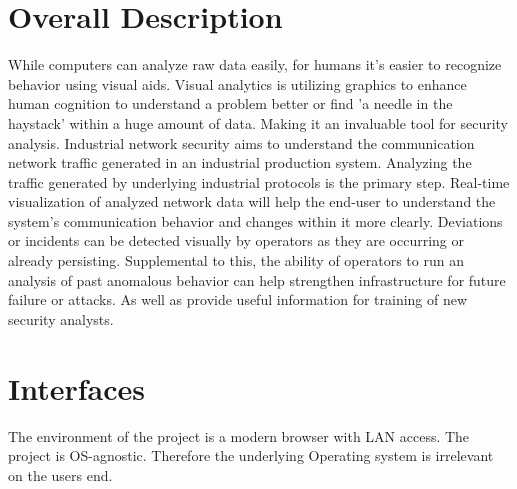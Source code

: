 \documentclass[twoside, english, draft]{Pflichtenheft}
\begin{document}
\section{Overall Description}

While computers can analyze raw data easily, for humans it's easier to recognize behavior using visual aids.
Visual analytics is utilizing graphics to enhance human cognition to understand a problem better or find 'a needle in the haystack' within a huge amount of data. Making it an invaluable tool for security analysis.
\newline
\newline
Industrial network security aims to understand the communication network traffic generated in an industrial production system. Analyzing the traffic generated by underlying industrial protocols is the primary step.
\newline
\newline
Real-time visualization of analyzed network data will help the end-user to understand the system's communication behavior and changes within it more clearly. Deviations or incidents can be detected visually by operators as they are occurring or already persisting.\newline
\newline
Supplemental to this, the ability of operators to run an analysis of past anomalous behavior can help strengthen infrastructure for future failure or attacks. As well as provide useful information for training of new security analysts.
\newpage
\section{Interfaces}


The environment of the project is a modern browser with LAN access. The project is OS-agnostic. Therefore the underlying Operating system is irrelevant on the users end.
\end{document}

